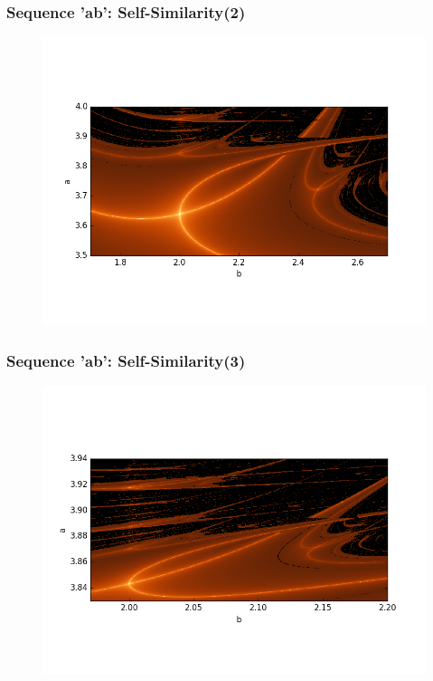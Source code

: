 \documentclass[ignorenonframetext]{beamer}
\begin{document}
\begin{frame}
\frametitle{Sequence 'ab': Self-Similarity(2)}
\begin{figure}[htbp]
\includegraphics[scale = 0.5]{pictures/ab_selfsim_2.png}
\end{figure}
\end{frame}

\begin{frame}
\frametitle{Sequence 'ab': Self-Similarity(3)}
\begin{figure}[htbp]
\includegraphics[scale = 0.5]{pictures/ab_selfsim_3.png}
\end{figure}
\end{frame}
\end{document}
